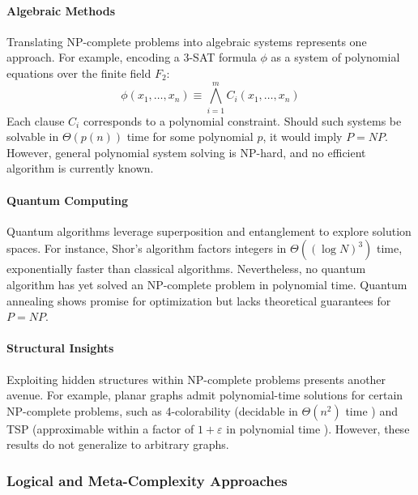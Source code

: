 \documentclass[acmsmall]{acmart}
\begin{document}
	\paragraph{\textbf{Algebraic Methods}}
	\hspace{0.7em}Translating NP-complete problems into algebraic systems represents one approach. For example, encoding a 3-SAT formula \( \phi \) as a system of polynomial equations over the finite field \(F_2\):
	\begin{equation}
		\phi(x_1,\ldots,x_n) \equiv \bigwedge_{i=1}^m  C_i(x_1,\ldots,x_n)
	\end{equation}
	Each clause \( C_i \) corresponds to a polynomial constraint. Should such systems be solvable in \( \Theta(p(n)) \) time for some polynomial \( p \), it would imply \( P = NP \). However, general polynomial system solving is NP-hard, and no efficient algorithm is currently known.
	
	\paragraph{\textbf{Quantum Computing}}
	
	\hspace{0.7em}Quantum algorithms leverage superposition and entanglement to explore solution spaces. For instance, Shor's algorithm factors integers in \( \Theta((\log N)^3) \) time, exponentially faster than classical algorithms. Nevertheless, no quantum algorithm has yet solved an NP-complete problem in polynomial time. Quantum annealing shows promise for optimization but lacks theoretical guarantees for \( P = NP \).
	
	\paragraph{\textbf{Structural Insights}}
	
	\hspace{0.7em}Exploiting hidden structures within NP-complete problems presents another avenue. For example, planar graphs admit polynomial-time solutions for certain NP-complete problems, such as 4-colorability (decidable in \( \Theta(n^2) \) time ) and TSP (approximable within a factor of \( 1 + \varepsilon \) in polynomial time ). However, these results do not generalize to arbitrary graphs.
	
	\subsubsection{Logical and Meta-Complexity Approaches}
	
\end{document}
